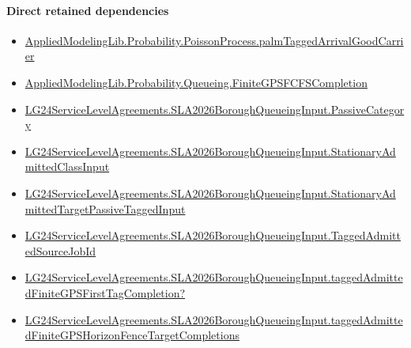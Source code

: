 \documentclass[10pt]{article}
\begin{document}
\paragraph{Direct retained dependencies}
\begin{itemize}\raggedright
\item \hyperlink{governing-declaration-ae13476c571ece6d}{Applied\allowbreak{}Modeling\allowbreak{}Lib.\allowbreak{}Probability.\allowbreak{}Poisson\allowbreak{}Process.\allowbreak{}palm\allowbreak{}Tagged\allowbreak{}Arrival\allowbreak{}Good\allowbreak{}Carrier}
\item \hyperlink{governing-declaration-73bff5fa8f16fe86}{Applied\allowbreak{}Modeling\allowbreak{}Lib.\allowbreak{}Probability.\allowbreak{}Queueing.\allowbreak{}Finite\allowbreak{}GPSFCFS\allowbreak{}Completion}
\item \hyperlink{governing-declaration-abc91e26948cf0a3}{LG24\allowbreak{}Service\allowbreak{}Level\allowbreak{}Agreements.\allowbreak{}SLA2026\allowbreak{}Borough\allowbreak{}Queueing\allowbreak{}Input.\allowbreak{}Passive\allowbreak{}Category}
\item \hyperlink{governing-declaration-f3072ff54a3653c2}{LG24\allowbreak{}Service\allowbreak{}Level\allowbreak{}Agreements.\allowbreak{}SLA2026\allowbreak{}Borough\allowbreak{}Queueing\allowbreak{}Input.\allowbreak{}Stationary\allowbreak{}Admitted\allowbreak{}Class\allowbreak{}Input}
\item \hyperlink{governing-declaration-8796a25a610eaea9}{LG24\allowbreak{}Service\allowbreak{}Level\allowbreak{}Agreements.\allowbreak{}SLA2026\allowbreak{}Borough\allowbreak{}Queueing\allowbreak{}Input.\allowbreak{}Stationary\allowbreak{}Admitted\allowbreak{}Target\allowbreak{}Passive\allowbreak{}Tagged\allowbreak{}Input}
\item \hyperlink{governing-declaration-03f187b908407c39}{LG24\allowbreak{}Service\allowbreak{}Level\allowbreak{}Agreements.\allowbreak{}SLA2026\allowbreak{}Borough\allowbreak{}Queueing\allowbreak{}Input.\allowbreak{}Tagged\allowbreak{}Admitted\allowbreak{}Source\allowbreak{}Job\allowbreak{}Id}
\item \hyperlink{governing-declaration-5d77431cad7d2574}{LG24\allowbreak{}Service\allowbreak{}Level\allowbreak{}Agreements.\allowbreak{}SLA2026\allowbreak{}Borough\allowbreak{}Queueing\allowbreak{}Input.\allowbreak{}tagged\allowbreak{}Admitted\allowbreak{}Finite\allowbreak{}GPS\allowbreak{}First\allowbreak{}Tag\allowbreak{}Completion?}
\item \hyperlink{governing-declaration-9fb2ae13890b5aa8}{LG24\allowbreak{}Service\allowbreak{}Level\allowbreak{}Agreements.\allowbreak{}SLA2026\allowbreak{}Borough\allowbreak{}Queueing\allowbreak{}Input.\allowbreak{}tagged\allowbreak{}Admitted\allowbreak{}Finite\allowbreak{}GPS\allowbreak{}Horizon\allowbreak{}Fence\allowbreak{}Target\allowbreak{}Completions}
\end{itemize}
\hypertarget{governing-declaration-428770db1fa0a080}{}
\end{document}
